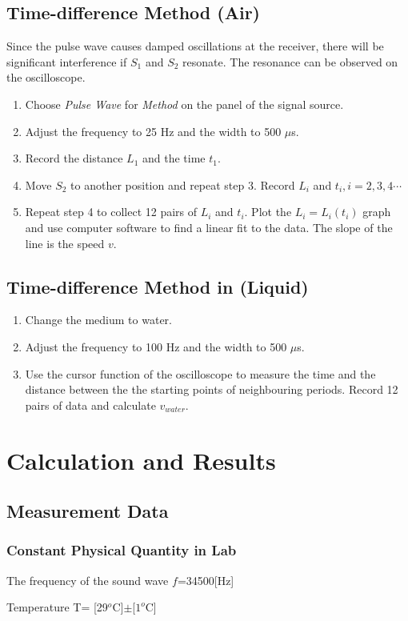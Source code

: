 \documentclass[12pt]{article}
\begin{document}
\subsection{Time-difference Method (Air)}
Since the pulse wave causes damped oscillations at the receiver, there will be significant interference if $S_1$ and $S_2$ resonate. The resonance can be observed on the oscilloscope.
\begin{enumerate}
\item Choose \emph{Pulse Wave} for \emph{Method} on the panel of the signal source.
\item Adjust the frequency to 25 Hz and the width to 500 $\mu$s.
\item Record the distance $L_1$ and the time $t_1$.
\item Move $S_2$ to another position and repeat step 3. Record $L_i$ and $t_i,i=2,3,4\cdots$
\item Repeat step 4 to collect 12 pairs of $L_i$ and $t_i$. Plot the $L_i=L_i(t_i)$ graph and use computer software to find a linear fit to the data. The slope of the line is the speed $v$.
\end{enumerate}
\subsection{Time-difference Method in (Liquid)}
\begin{enumerate}
\item Change the medium to water.
\item Adjust the frequency to 100 Hz and the width to 500 $\mu$s.
\item Use the cursor function of the oscilloscope to measure the time and the distance
between the the starting points of neighbouring periods. Record 12 pairs of data and
calculate $v_{water}$.
\end{enumerate}
\section{Calculation and Results}
\subsection{Measurement Data}
\subsubsection{Constant Physical Quantity in Lab}
The frequency of the sound wave $f$=34500[Hz]
\par Temperature T= [29$^o$C]$\pm$[$1^o$C]
\end{document}

